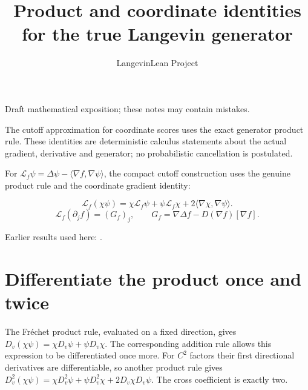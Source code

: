 \documentclass[11pt,a4paper]{article}
\title{\texorpdfstring{Product and coordinate identities for the true Langevin generator}{Product and coordinate identities for the true Langevin generator}}
\author{LangevinLean Project}
\date{}
\begin{document}
\maketitle
Draft mathematical exposition; these notes may contain mistakes.


The cutoff approximation for coordinate scores uses the exact generator product rule. These identities are deterministic calculus statements about the actual gradient, derivative and generator; no probabilistic cancellation is postulated.



For \(\mathcal L_f\psi=\Delta\psi-\langle\nabla f,\nabla\psi\rangle\), the compact cutoff construction uses the genuine product rule and the coordinate gradient identity:


\[\mathcal L_f(\chi\psi)=\chi\mathcal L_f\psi+\psi\mathcal L_f\chi+2\langle\nabla\chi,\nabla\psi\rangle.\]
\[\mathcal L_f(\partial_jf)=(G_f)_j,\qquad G_f=\nabla\Delta f-D(\nabla f)[\nabla f].\]

Earlier results used here: \cite[Section~3.46]{LangevinLean2026ULASC}.

\section{\texorpdfstring{Differentiate the product once and twice}{Differentiate the product once and twice}}


The Fréchet product rule, evaluated on a fixed direction, gives \(D_{v}(\chi \psi )=\chi D_{v}\psi +\psi D_{v}\chi\). The corresponding addition rule allows this expression to be differentiated once more. For \(C^{2}\) factors their first directional derivatives are differentiable, so another product rule gives \(D_{v}^{2}(\chi \psi )=\chi D_{v}^{2}\psi +\psi D_{v}^{2}\chi +2D_{v}\chi D_{v}\psi\). The cross coefficient is exactly two.
\end{document}
